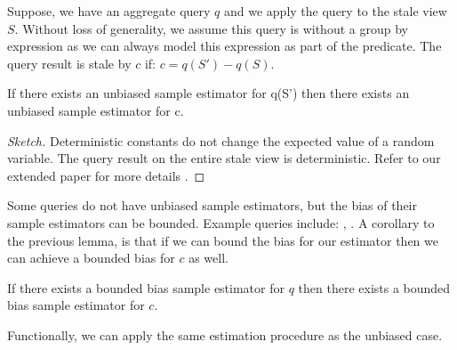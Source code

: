 Suppose, we have an aggregate query $q$ and we apply the query to the stale view $S$.
Without loss of generality, we assume this query is without a group by expression as we can always model this expression as part of the predicate.
The query result is stale by $c$ if:
$ c = q(S') - q(S)$.
\begin{lemma}\label{lemma:unbiased}
If there exists an unbiased sample estimator for q(S') then there exists an unbiased sample estimator for c.
\end{lemma}
\begin{proof}[Sketch] 
Deterministic constants do not change the expected value of a random variable.
The query result on the entire stale view is deterministic.
Refer to our extended paper for more details \cite{technicalReport}.
\end{proof}

\iffalse
Suppose, we have an unbiased sample estimator $\bar{q}$ of $q$. 
Then, it follows that \[\mathbb{E}\big[\bar{q}(\hat{S'})\big] = q(S')\]
If we substitute in this expression:
\[ c = \mathbb{E}\big[\bar{q}(\hat{S'})\big] -q(s) \] 
Applying the linearity of expectation:
\[ c = \mathbb{E}\big[\bar{q}(\hat{S'}) - q(s)\big] \]
\fi

Some queries do not have unbiased sample estimators, but the bias of their sample estimators can be bounded. Example queries include: \medfunc, \percfunc.
A corollary to the previous lemma, is that if we can bound the bias for our estimator then we can achieve a bounded bias for $c$ as well.
\begin{corollary}
If there exists a bounded bias sample estimator for $q$ then there exists a bounded bias sample estimator for $c$.
\end{corollary}
Functionally, we can apply the same estimation procedure as the unbiased case.




